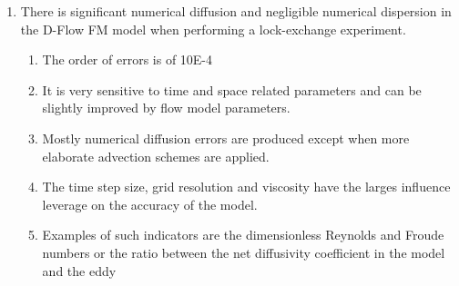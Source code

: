 \begin{enumerate}
\def\labelenumi{\arabic{enumi}.}
\tightlist
\item
  There is significant numerical diffusion and negligible numerical
  dispersion in the D-Flow FM model when performing a lock-exchange
  experiment.

  \begin{enumerate}
  \def\labelenumii{\arabic{enumii}.}
  \tightlist
  \item
    The order of errors is of 10E-4
  \item
    It is very sensitive to time and space related parameters and can be
    slightly improved by flow model parameters.
  \item
    Mostly numerical diffusion errors are produced except when more
    elaborate advection schemes are applied.
  \item
    The time step size, grid resolution and viscosity have the larges
    influence leverage on the accuracy of the model.
  \item
    Examples of such indicators are the dimensionless Reynolds and
    Froude numbers or the ratio between the net diffusivity coefficient
    in the model and the eddy
  \end{enumerate}
\end{enumerate}
